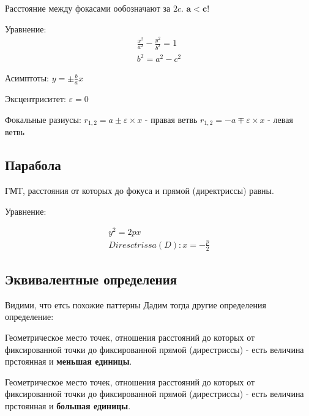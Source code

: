 \documentclass[12pt, a4paper]{article}
\begin{document}
    Расстояние между фокасами ообозначают за $2c$.
    $\symbf{a < c}$!

    Уравнение:
    \begin{gather}
        \frac{x^2}{a^2} - \frac{y^2}{b^2} = 1 \\
        b^2 = a^2 - c^2
    \end{gather}

    Асимптоты: $y = \pm \frac{b}{a} x$
    
    Эксцентриситет: $\varepsilon = 0$

    Фокальные разиусы:
    $r_{1, 2} = a \pm \varepsilon \times x$ - правая ветвь
    $r_{1, 2} = -a \mp \varepsilon \times x$ - левая ветвь



    \subsection{Парабола}
    
    \begin{definition}
        [Парабола]
        ГМТ, расстояния от которых до фокуса и прямой (директриссы) равны.
    \end{definition}
    
    Уравнение:

    \begin{gather}
        y^2 = 2px \\
        Diresctrissa (D): x = -\frac{p}{2}
    \end{gather}
    

    \subsection{Эквивалентные определения}
    Видими, что етсь похожие паттерны
    Дадим тогда другие определения определение:
    
    \begin{definition}
        [Эллипс]
        Геометрическое место точек, 
        отношения расстояний до которых от фиксированной точки 
        до фиксированной прямой (дирестриссы) - 
        есть величина прстоянная и \textbf{меньшая единицы}.
    \end{definition}

    \begin{definition}
        [Гипербола]
        Геометрическое место точек, 
        отношения расстояний до которых от фиксированной точки 
        до фиксированной прямой (дирестриссы) - 
        есть величина прстоянная и \textbf{большая единицы}.
    \end{definition}
\end{document}
